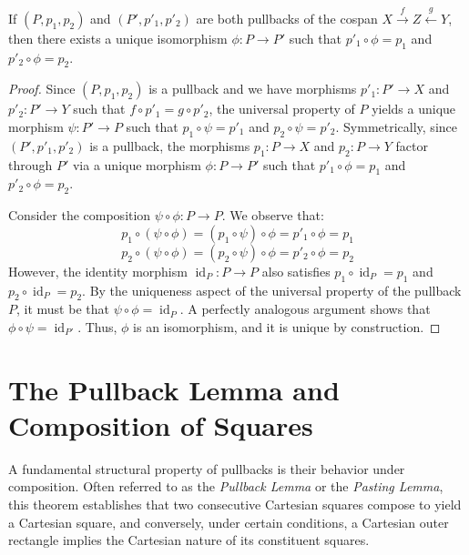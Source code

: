 \begin{lemma}
\label{lem:pullback_uniqueness}
If $(P, p_1, p_2)$ and $(P', p'_1, p'_2)$ are both pullbacks of the cospan $X \xrightarrow{f} Z \xleftarrow{g} Y$, then there exists a unique isomorphism $\phi: P \to P'$ such that $p'_1 \circ \phi = p_1$ and $p'_2 \circ \phi = p_2$.
\end{lemma}

\begin{proof}
Since $(P, p_1, p_2)$ is a pullback and we have morphisms $p'_1: P' \to X$ and $p'_2: P' \to Y$ such that $f \circ p'_1 = g \circ p'_2$, the universal property of $P$ yields a unique morphism $\psi: P' \to P$ such that $p_1 \circ \psi = p'_1$ and $p_2 \circ \psi = p'_2$. 
Symmetrically, since $(P', p'_1, p'_2)$ is a pullback, the morphisms $p_1: P \to X$ and $p_2: P \to Y$ factor through $P'$ via a unique morphism $\phi: P \to P'$ such that $p'_1 \circ \phi = p_1$ and $p'_2 \circ \phi = p_2$.

Consider the composition $\psi \circ \phi: P \to P$. We observe that:
\[
p_1 \circ (\psi \circ \phi) = (p_1 \circ \psi) \circ \phi = p'_1 \circ \phi = p_1
\]
\[
p_2 \circ (\psi \circ \phi) = (p_2 \circ \psi) \circ \phi = p'_2 \circ \phi = p_2
\]
However, the identity morphism $\operatorname{id}_P: P \to P$ also satisfies $p_1 \circ \operatorname{id}_P = p_1$ and $p_2 \circ \operatorname{id}_P = p_2$. By the uniqueness aspect of the universal property of the pullback $P$, it must be that $\psi \circ \phi = \operatorname{id}_P$. 
A perfectly analogous argument shows that $\phi \circ \psi = \operatorname{id}_{P'}$. Thus, $\phi$ is an isomorphism, and it is unique by construction.
\end{proof}

\section{The Pullback Lemma and Composition of Squares}

A fundamental structural property of pullbacks is their behavior under composition. Often referred to as the \emph{Pullback Lemma} or the \emph{Pasting Lemma}, this theorem establishes that two consecutive Cartesian squares compose to yield a Cartesian square, and conversely, under certain conditions, a Cartesian outer rectangle implies the Cartesian nature of its constituent squares.

